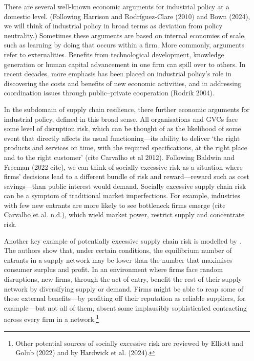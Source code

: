 \documentclass{article}
\begin{document}
There are several well-known economic arguments for industrial policy at a domestic level. (Following Harrison and Rodríguez-Clare (2010) and Bown (2024), we will think of industrial policy in broad terms as deviation from policy neutrality.) Sometimes these arguments are based on internal economies of scale, such as learning by doing that occurs within a firm. More commonly, arguments refer to externalities. Benefits from technological development, knowledge generation or human capital advancement in one firm can spill over to others. In recent decades, more emphasis has been placed on industrial policy's role in discovering the costs and benefits of new economic activities, and in addressing coordination issues through public--private cooperation (Rodrik 2004).

In the subdomain of supply chain resilience, there further economic arguments for industrial policy, defined in this broad sense. All organisations and GVCs face some level of disruption risk, which can be thought of as the likelihood of some event that directly affects its usual functioning---its ability to deliver `the right products and services on time, with the required specifications, at the right place and to the right customer' (cite Carvalho et al 2012). Following Baldwin and Freeman (2022 cite), we can think of socially excessive risk as a situation where firms' decisions lead to a different bundle of risk and reward---reward such as cost savings---than public interest would demand. Socially excessive supply chain risk can be a symptom of traditional market imperfections. For example, industries with few new entrants are more likely to see bottleneck firms emerge (cite Carvalho et al. n.d.), which wield market power, restrict supply and concentrate risk.

Another key example of potentially excessive supply chain risk is modelled by \textcite{bimpikis_supply_2019}. The authors show that, under certain conditions, the equilibrium number of entrants in a supply network may be lower than the number that maximises consumer surplus and profit. In an environment where firms face random disruptions, new firms, through the act of entry, benefit the rest of their supply network by diversifying supply or demand. Firms might be able to reap some of these external benefits---by profiting off their reputation as reliable suppliers, for example---but not all of them, absent some implausibly sophisticated contracting across every firm in a network.\footnote{Other potential sources of socially excessive risk are reviewed by Elliott and Golub (2022) and by Hardwick et al. (2024).} 
\end{document}
